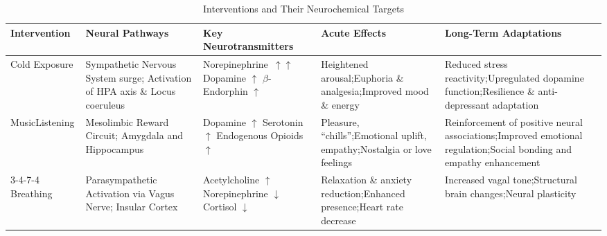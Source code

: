 \documentclass[11pt]{article}
\newcommand{\quotes}[1]{``#1''}
\begin{document}
\begin{table}[ht]
\caption{Interventions and Their Neurochemical Targets}
\centering
\begin{tabular}{p{2cm}p{2.5cm}p{3cm}p{3cm}p{4cm}}
\toprule
\textbf{Intervention} & \textbf{Neural Pathways} & \textbf{Key Neurotransmitters} & \textbf{Acute Effects} & \textbf{Long-Term Adaptations}\\
\midrule
Cold Exposure & Sympathetic Nervous System surge; Activation of HPA axis \& Locus coeruleus & Norepinephrine~$\uparrow\uparrow$ \newline Dopamine $\uparrow$ \newline $\beta$-Endorphin $\uparrow$ & Heightened arousal;\newline Euphoria \& analgesia;\newline Improved mood \& energy & Reduced stress reactivity;\newline Upregulated dopamine function;\newline Resilience \& anti-depressant adaptation\\
\midrule
Music\newline Listening & Mesolimbic Reward Circuit; Amygdala and Hippocampus & Dopamine $\uparrow$ \newline Serotonin $\uparrow$ \newline Endogenous Opioids $\uparrow$ & Pleasure, \quotes{chills};\newline Emotional uplift, empathy;\newline Nostalgia or love feelings & Reinforcement of positive neural associations;\newline Improved emotional regulation;\newline Social bonding and empathy enhancement \\
\midrule
3-4-7-4 Breathing & Parasympathetic Activation via Vagus Nerve; Insular Cortex & Acetylcholine $\uparrow$ \newline Norepinephrine $\downarrow$ \newline Cortisol $\downarrow$ & Relaxation \& anxiety reduction;\newline Enhanced presence;\newline Heart rate decrease & Increased vagal tone;\newline Structural brain changes;\newline Neural plasticity \\
\bottomrule
\end{tabular}\label{tab:interventions}
\end{table}
\end{document}
